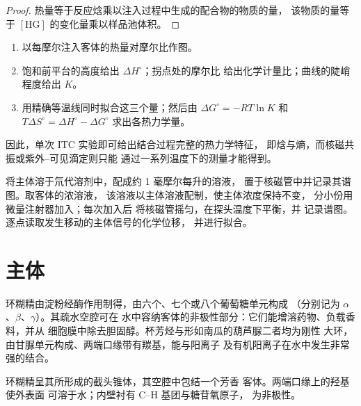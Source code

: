 \begin{proof}
热量等于反应焓乘以注入过程中生成的配合物的物质的量，
该物质的量等于 $[\mathrm{HG}]$ 的变化量乘以样品池体积。
\end{proof}

\begin{method}\label{met:b3:supramolecular:itc}
\begin{enumerate}
  \item 以每摩尔注入客体的热量对摩尔比作图。
  \item 饱和前平台的高度给出 $\Delta H^\circ$；拐点处的摩尔比
        给出化学计量比；曲线的陡峭程度给出 $K$。
  \item 用精确等温线同时拟合这三个量；然后由 $\Delta G^\circ = -RT\ln K$ 和
        $T\Delta S^\circ = \Delta H^\circ - \Delta G^\circ$ 求出各热力学量。
\end{enumerate}
\end{method}

因此，单次 ITC 实验即可给出结合过程完整的热力学特征，
即焓与熵，而核磁共振或紫外–可见滴定则只能
通过一系列温度下的测量才能得到。

\begin{inthelab}[核磁共振滴定]
将主体溶于氘代溶剂中，配成约 1 毫摩尔每升的溶液，
置于核磁管中并记录其谱图。取客体的浓溶液，
该溶液以主体溶液配制，使主体浓度保持不变，
分小份用微量注射器加入；每次加入后
将核磁管摇匀，在探头温度下平衡，并
记录谱图。逐点读取发生移动的主体信号的化学位移，
并进行拟合。
\end{inthelab}

\section{主体}

环糊精由淀粉经酶作用制得，由六个、七个或八个葡萄糖单元构成
（分别记为 $\alpha$、$\beta$、$\gamma$）。其疏水空腔可在
水中容纳客体的非极性部分：它们能增溶药物、负载香料，并从
细胞膜中除去胆固醇。杯芳烃与形如南瓜的葫芦脲二者均为刚性
大环，由甘脲单元构成、两端口缘带有羰基，能与阳离子
及有机阳离子在水中发生非常强的结合。

\begin{omfigure}

{\small 环糊精呈其所形成的截头锥体，其空腔中包结一个芳香
客体。两端口缘上的羟基使外表面
可溶于水；内壁衬有 C--H 基团与糖苷氧原子，
为非极性。}
\end{omfigure}

